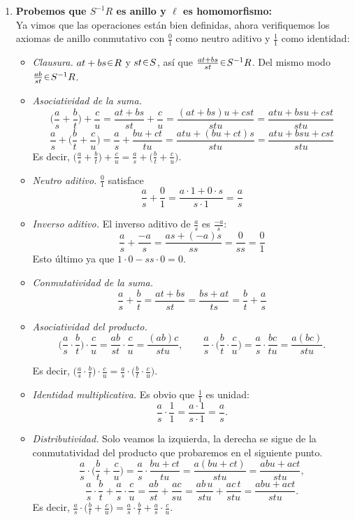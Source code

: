 \begin{sol}[Demostración]
\begin{enumerate}[label=(\alph*)]
\item \textbf{Probemos que $S^{-1}R$ es anillo y $\ell$ es homomorfismo:}\\
Ya vimos que las operaciones están bien definidas, ahora verifiquemos los axiomas de anillo conmutativo con $\frac01$ como neutro aditivo y $\tfrac11$ como identidad:
\begin{itemize}
\item \emph{Clausura.}
$at+bs\en R$ y $st\en S$, así que $\frac{at+bs}{st}\en S^{-1}R$. Del mismo modo $\frac{ab}{st}\en S^{-1}R$.

\item \emph{Asociatividad de la suma.}
\[
\Big(\frac{a}{s}+\frac{b}{t}\Big)+\frac{c}{u}
= \frac{at+bs}{st}+\frac{c}{u}
= \frac{(at+bs)u + cst}{stu}
= \frac{atu+b s u+c s t}{stu}
\]
\[
\frac{a}{s}+\Big(\frac{b}{t}+\frac{c}{u}\Big)
= \frac{a}{s}+\frac{bu+ct}{tu}
= \frac{a tu + (bu+ct)s}{stu}
= \frac{atu + bsu + cst}{stu}
\]
Es decir, $\Big(\frac{a}{s}+\frac{b}{t}\Big)+\frac{c}{u} = \frac{a}{s}+\Big(\frac{b}{t}+\frac{c}{u}\Big)$.
\item \emph{Neutro aditivo.} $\frac{0}{1}$ satisface
\[
\frac{a}{s}+\frac{0}{1}=\frac{a\cdot 1 + 0\cdot s}{s\cdot 1}=\frac{a}{s}
\]

\item \emph{Inverso aditivo.} El inverso aditivo de $\frac{a}{s}$ es $\frac{-a}{s}$:
\[
\frac{a}{s}+\frac{-a}{s}=\frac{as+(-a)s}{ss}=\frac{0}{ss}=\frac{0}{1}
\]
Esto último ya que $1\cdot0 - ss\cdot0 = 0$.

\item \emph{Conmutatividad de la suma.}
\[
\frac{a}{s}+\frac{b}{t}=\frac{at+bs}{st}=\frac{bs+at}{ts}=\frac{b}{t}+\frac{a}{s}
\]

\item \emph{Asociatividad del producto.}
\[
\Big(\frac{a}{s}\cdot\frac{b}{t}\Big)\cdot\frac{c}{u}
= \frac{ab}{st}\cdot\frac{c}{u}
= \frac{(ab)c}{stu},
\qquad
\frac{a}{s}\cdot\Big(\frac{b}{t}\cdot\frac{c}{u}\Big)
= \frac{a}{s}\cdot\frac{bc}{tu}
= \frac{a(bc)}{stu}.
\]

Es decir, $\Big(\frac{a}{s}\cdot\frac{b}{t}\Big)\cdot\frac{c}{u} = \frac{a}{s}\cdot\Big(\frac{b}{t}\cdot\frac{c}{u}\Big)$.

\item \emph{Identidad multiplicativa.} Es obvio que $\frac{1}{1}$ es unidad:
\[
\frac{a}{s}\cdot\frac{1}{1}=\frac{a\cdot 1}{s\cdot 1}=\frac{a}{s}.
\]

\item \emph{Distributividad.} Solo veamos la izquierda, la derecha se sigue de la conmutatividad del producto que probaremos en el siguiente punto.
\[
\frac{a}{s}\cdot\Big(\frac{b}{t}+\frac{c}{u}\Big)
= \frac{a}{s}\cdot\frac{bu+ct}{tu}
= \frac{a(bu+ct)}{stu}
= \frac{abu + act}{stu},
\]
\[
\frac{a}{s}\cdot\frac{b}{t} + \frac{a}{s}\cdot\frac{c}{u}
= \frac{ab}{st} + \frac{ac}{su}
= \frac{ab\,u}{stu} + \frac{ac\,t}{stu}
= \frac{abu + act}{stu}.
\]
Es decir, $\frac{a}{s}\cdot\Big(\frac{b}{t}+\frac{c}{u}\Big) = \frac{a}{s}\cdot\frac{b}{t} + \frac{a}{s}\cdot\frac{c}{u}$.


\end{itemize}
\end{enumerate}
\end{sol}
